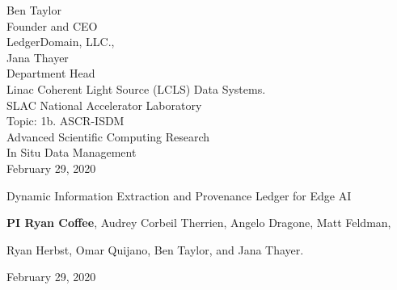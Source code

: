 \documentclass{article}
\begin{document}
\begin{centering}
	Ben Taylor\\
	Founder and CEO\\
	LedgerDomain, LLC.,\\
	\vspace{.5\baselineskip}
	Jana Thayer\\
	Department Head\\
	Linac Coherent Light Source (LCLS) Data Systems.\\
	SLAC National Accelerator Laboratory\\
	\vspace{\baselineskip}
	Topic: 1b. ASCR-ISDM\\
	Advanced Scientific Computing Research\\
	In Situ Data Management\\
	\vspace{\baselineskip}
	February 29, 2020\\
\end{centering}
\break
\centerline{\large{Dynamic Information Extraction and Provenance Ledger for Edge AI}}
\normalsize
\vspace{0.5\baselineskip}
\centerline{\textbf{PI Ryan Coffee},
Audrey Corbeil Therrien,
Angelo Dragone,
Matt Feldman,}
\centerline{
Ryan Herbst,
Omar Quijano,
Ben Taylor, and 
Jana Thayer.
}
\centerline{February 29, 2020}
\vspace{0.5\baselineskip}
\end{document}
